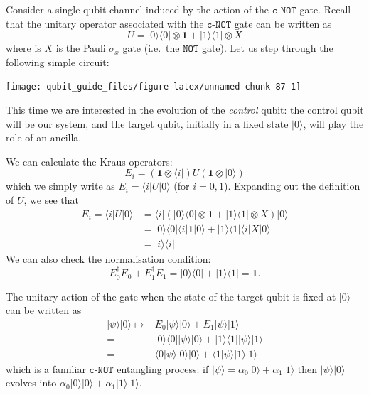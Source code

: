 \documentclass[fleqn,a4paper]{article}
\theoremstyle{definition}
\theoremstyle{definition}
\theoremstyle{definition}
\theoremstyle{definition}
\theoremstyle{remark}
\begin{document}
Consider a single-qubit channel induced by the action of the \(\texttt{c-NOT}\) gate.
Recall that the unitary operator associated with the \(\texttt{c-NOT}\) gate can be written as
\[
  U = |0\rangle\langle 0|\otimes\mathbf{1}+ |1\rangle\langle 1|\otimes X
\]
where is \(X\) is the Pauli \(\sigma_x\) gate (i.e.~the \(\texttt{NOT}\) gate).
Let us step through the following simple circuit:

\begin{center}\texttt{[image: qubit\_guide\_files/figure-latex/unnamed-chunk-87-1]} \end{center}

This time we are interested in the evolution of the \emph{control} qubit: the control qubit will be our system, and the target qubit, initially in a fixed state \(|0\rangle\), will play the role of an ancilla.

We can calculate the Kraus operators:
\[
  E_i = (\mathbf{1}\otimes\langle i|) U (\mathbf{1}\otimes|0\rangle)
\]
which we simply write as \(E_i=\langle i|U|0\rangle\) (for \(i=0,1\)).
Expanding out the definition of \(U\), we see that
\[
  \begin{aligned}
    E_i = \langle i|U|0\rangle
    &= \langle i| (|0\rangle\langle 0|\otimes\mathbf{1}+ |1\rangle\langle 1|\otimes X) |0\rangle
  \\&= |0\rangle\langle 0|\langle i|\mathbf{1}|0\rangle + |1\rangle\langle 1|\langle i|X|0\rangle
  \\&= |i\rangle\langle i|
\end{aligned}
\]
We can also check the normalisation condition:
\[
  E_0^\dagger E_0 + E_1^\dagger E_1
  = |0\rangle\langle 0| + |1\rangle\langle 1|
  =\mathbf{1}.
\]

The unitary action of the gate when the state of the target qubit is fixed at \(|0\rangle\) can be written as
\[
  \begin{aligned}
    |\psi\rangle|0\rangle
    \longmapsto
    & E_0|\psi\rangle|0\rangle + E_1|\psi\rangle|1\rangle
  \\=& |0\rangle\langle 0||\psi\rangle|0\rangle + |1\rangle\langle 1||\psi\rangle|1\rangle
  \\=& \langle 0|\psi\rangle|0\rangle|0\rangle + \langle 1|\psi\rangle|1\rangle|1\rangle
  \end{aligned}
\]
which is a familiar \(\texttt{c-NOT}\) entangling process: if \(|\psi\rangle=\alpha_0|0\rangle+\alpha_1|1\rangle\) then \(|\psi\rangle|0\rangle\) evolves into \(\alpha_0|0\rangle|0\rangle+\alpha_1|1\rangle|1\rangle\).
\end{document}
